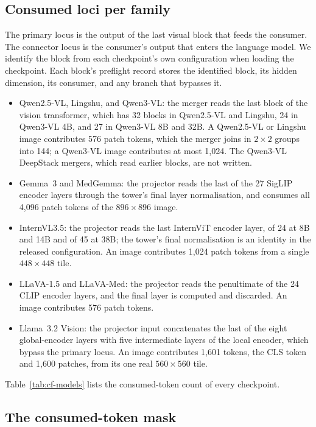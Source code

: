 \documentclass{article}
\begin{document}
\subsection{Consumed loci per family}
\label{app:repro-loci}

The primary locus is the output of the last visual block that feeds the consumer. The connector locus is the consumer's output that enters the language model. We identify the block from each checkpoint's own configuration when loading the checkpoint. Each block's preflight record stores the identified block, its hidden dimension, its consumer, and any branch that bypasses it.

\begin{itemize}[leftmargin=*,itemsep=1pt,topsep=2pt]
\item Qwen2.5-VL, Lingshu, and Qwen3-VL: the merger reads the last block of the vision transformer, which has 32 blocks in Qwen2.5-VL and Lingshu, 24 in Qwen3-VL 4B, and 27 in Qwen3-VL 8B and 32B. A Qwen2.5-VL or Lingshu image contributes 576 patch tokens, which the merger joins in $2\times2$ groups into 144; a Qwen3-VL image contributes at most 1{,}024. The Qwen3-VL DeepStack mergers, which read earlier blocks, are not written.
\item Gemma~3 and MedGemma: the projector reads the last of the 27 SigLIP encoder layers through the tower's final layer normalisation, and consumes all 4{,}096 patch tokens of the $896\times896$ image.
\item InternVL3.5: the projector reads the last InternViT encoder layer, of 24 at 8B and 14B and of 45 at 38B; the tower's final normalisation is an identity in the released configuration. An image contributes 1{,}024 patch tokens from a single $448\times448$ tile.
\item LLaVA-1.5 and LLaVA-Med: the projector reads the penultimate of the 24 CLIP encoder layers, and the final layer is computed and discarded. An image contributes 576 patch tokens.
\item Llama~3.2 Vision: the projector input concatenates the last of the eight global-encoder layers with five intermediate layers of the local encoder, which bypass the primary locus. An image contributes 1{,}601 tokens, the CLS token and 1{,}600 patches, from its one real $560\times560$ tile.
\end{itemize}
Table~\ref{tab:cf-models} lists the consumed-token count of every checkpoint.

\subsection{The consumed-token mask}
\label{app:repro-mask}
\end{document}
